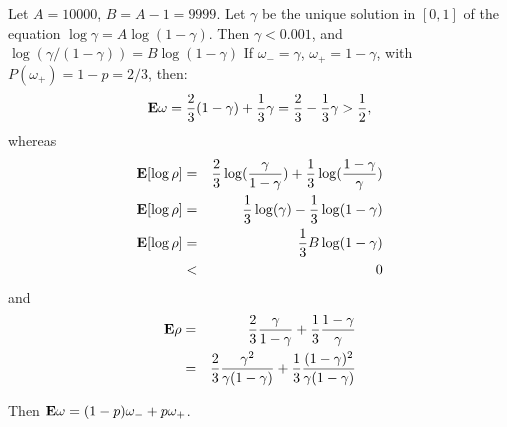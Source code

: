 \documentclass[11pt]{article} \usepackage{amssymb}
\newcommand{\E}{{\bf E}} \newcommand{\Cov}{{\bf Cov}}
\begin{document}
Let $A=10000$, $B=A-1=9999$. 
Let $\gamma$ be the unique solution in $[0,1]$ of the equation 
$\log\gamma=A\log(1-\gamma)$. Then $\gamma<0.001$, and $\log(\gamma/(1-\gamma))=B\log(1-\gamma)$
If $\omega_-=\gamma$, $\omega_+=1-\gamma$, with $P(\omega_+)=1-p=2/3$, then:
\begin{equation*}
  \E\omega={2\over 3}(1-\gamma)+{1\over 3}\gamma
          ={2\over 3}-{1\over 3}\gamma>{1\over 2},
\end{equation*}
whereas 
\begin{eqnarray*}
  \E[\log\rho]&=&{2\over 3}\log({\gamma\over 1-\gamma})+
                 {1\over 3}\log({1-\gamma\over \gamma})\\
  \E[\log\rho]&=&{1\over 3}\log(\gamma)-
                 {1\over 3}\log(1-\gamma)\\
  \E[\log\rho]&=&{1\over 3}B\log(1-\gamma)\\
              &<&0
\end{eqnarray*} 
and
\begin{eqnarray*}
  \E\rho
  &=& {2\over 3}{\gamma \over 1-\gamma}+{1\over 3}{1-\gamma \over \gamma}\\
  &=& {2\over 3}{\gamma^2 \over \gamma(1-\gamma)}
      +{1\over 3}{(1-\gamma)^2 \over \gamma(1-\gamma)}\\
\end{eqnarray*}

Then 
$\E\omega=(1-p)\omega_-+p\omega_+$. 
\end{document}
